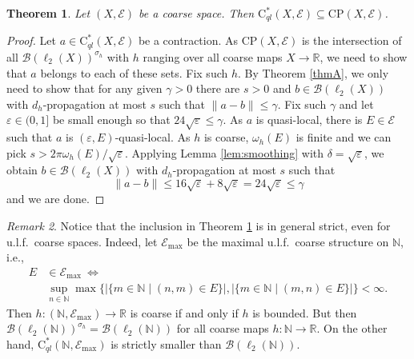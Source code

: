 \documentclass[11pt]{amsart}
\newcommand{\R}{\mathbb{R}}
\newcommand{\N}{\mathbb{N}}
\newcommand{\cB}{\mathcal{B}}
\newcommand{\cE}{\mathcal{E}}
\newcommand{\eps}{\varepsilon}
\newcommand{\cstql}{\mathrm{C}^*_{\textit{ql}}}
\newcommand{\CP}{\mathrm{CP}}
\numberwithin{equation}{section}
\newtheorem{theorem}{Theorem}[section]
\theoremstyle{definition}
\theoremstyle{remark}
\newtheorem{remark}[theorem]{Remark}
\begin{document}
\begin{theorem}\label{Thm.Quasi-LocalContainedContinuityPoints}
    Let $(X,\cE)$ be a   coarse space. Then $\cstql(X,\cE)\subseteq \CP(X,\cE)$.
\end{theorem}

\begin{proof}
    Let $a\in \cstql(X,\cE)$ be a contraction. As $\CP(X,\cE)$ is the intersection of all $\cB(\ell_2(X))^{\sigma_h}$ with $h$ ranging over   all coarse maps $  X\to \R$, we need to show that $a$ belongs to each of these sets. Fix such $h$. By Theorem \ref{thmA}, we only need to show that for any given $\gamma>0$ there are $s>0$ and $b\in \cB(\ell_2(X)) $ with $d_h$-propagation at most $s$ such that $\|a-b\|\leq \gamma$. Fix such $\gamma$ and let $\eps\in(0,1]$ be small enough so that $24\sqrt{\eps}\leq \gamma$. As $a$ is quasi-local, there is $E\in \cE$ such that $a$ is $(\eps,E)$-quasi-local. As $h$ is coarse, $\omega_h(E)$ is finite and we can pick $s>2\pi\omega_h(E)/\sqrt{\eps}$. Applying Lemma \ref{lem:smoothing} with  $\delta=\sqrt{\eps}$, we obtain $b\in \cB(\ell_2(X))$ with $d_h$-propagation at most $s$ such that
    \[\|a-b\|\leq 16\sqrt{\eps}+8\sqrt{\eps}=24\sqrt{\eps}\leq \gamma\]
    and we are done.
\end{proof}


\begin{remark}\label{RemarkContPointsCoarseSpaces}
    Notice that the inclusion in Theorem \ref{Thm.Quasi-LocalContainedContinuityPoints} is in general strict, even for u.l.f.\ coarse spaces.  Indeed, let $\cE_{\max}$ be the maximal u.l.f.\ coarse structure on $\N$, i.e., 
    \begin{align*}E&\in \cE_{\max}\ \Leftrightarrow\ \\
    &\sup_{n\in\N}\max\{|\{m\in \N\mid (n,m)\in E\}|,|\{m\in \N\mid (m,n)\in E\}|\}<\infty.\end{align*}Then $h\colon (\N,\cE_{\max})\to \R$ is coarse if and only if $h$ is bounded.  But then $\cB(\ell_2(\N))^{\sigma_h}=\cB(\ell_2(\N))$ for all coarse maps $h\colon \N\to \R$. On the other hand,  $\cstql(\N,\cE_{\max})$ is strictly smaller than $\cB(\ell_2(\N))$.
\end{remark}
\end{document}
